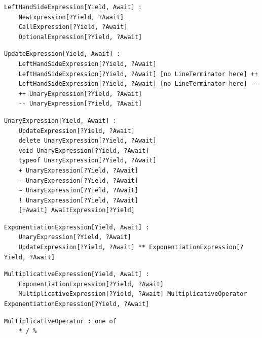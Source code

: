 \noindent\textbf{\texttt{}}\par
\begin{lstlisting}
LeftHandSideExpression[Yield, Await] :
    NewExpression[?Yield, ?Await]
    CallExpression[?Yield, ?Await]
    OptionalExpression[?Yield, ?Await]
\end{lstlisting}

\noindent\textbf{\texttt{}}\par
\begin{lstlisting}
UpdateExpression[Yield, Await] :
    LeftHandSideExpression[?Yield, ?Await]
    LeftHandSideExpression[?Yield, ?Await] [no LineTerminator here] ++
    LeftHandSideExpression[?Yield, ?Await] [no LineTerminator here] --
    ++ UnaryExpression[?Yield, ?Await]
    -- UnaryExpression[?Yield, ?Await]
\end{lstlisting}

\noindent\textbf{\texttt{}}\par
\begin{lstlisting}
UnaryExpression[Yield, Await] :
    UpdateExpression[?Yield, ?Await]
    delete UnaryExpression[?Yield, ?Await]
    void UnaryExpression[?Yield, ?Await]
    typeof UnaryExpression[?Yield, ?Await]
    + UnaryExpression[?Yield, ?Await]
    - UnaryExpression[?Yield, ?Await]
    ~ UnaryExpression[?Yield, ?Await]
    ! UnaryExpression[?Yield, ?Await]
    [+Await] AwaitExpression[?Yield]
\end{lstlisting}

\noindent\textbf{\texttt{}}\par
\begin{lstlisting}
ExponentiationExpression[Yield, Await] :
    UnaryExpression[?Yield, ?Await]
    UpdateExpression[?Yield, ?Await] ** ExponentiationExpression[?Yield, ?Await]
\end{lstlisting}

\noindent\textbf{\texttt{}}\par
\begin{lstlisting}
MultiplicativeExpression[Yield, Await] :
    ExponentiationExpression[?Yield, ?Await]
    MultiplicativeExpression[?Yield, ?Await] MultiplicativeOperator ExponentiationExpression[?Yield, ?Await]
\end{lstlisting}

\noindent\textbf{\texttt{}}\par
\begin{lstlisting}
MultiplicativeOperator : one of
    * / %
\end{lstlisting}

